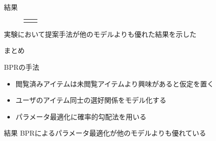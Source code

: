 \documentclass[aspectratio=43, dvipdfmx, 11pt]{beamer} %
\begin{document}
\begin{frame}{結果}
\begin{figure}[H]
\begin{tabular}{cc}
\begin{minipage}{0.5\hsize}
\begin{flushleft}
            \end{flushleft}
        \end{minipage}
    \end{tabular}
    \end{figure}
    
    実験において提案手法が他のモデルよりも優れた結果を示した
\end{frame}

\begin{frame}{まとめ}
    \begin{block}{BPRの手法}
        \begin{itemize}
            \item 閲覧済みアイテムは未閲覧アイテムより興味があると仮定を置く
            \item ユーザのアイテム同士の選好関係をモデル化する
            \item パラメータ最適化に確率的勾配法を用いる
        \end{itemize}
    \end{block}

    \begin{block}{結果}
        BPRによるパラメータ最適化が他のモデルよりも優れている
    \end{block}

\end{frame}
\end{document}
